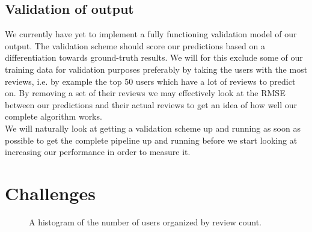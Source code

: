 \documentclass[10pt,twocolumn,letterpaper]{article}
\begin{document}
\subsection{Validation of output}
We currently have yet to implement a fully functioning validation model of our output. The validation scheme should score our predictions based on a differentiation towards ground-truth results. We will for this exclude some of our training data for validation purposes preferably by taking the users with the most reviews, i.e. by example the top 50 users which have a lot of reviews to predict on. By removing a set of their reviews we may effectively look at the RMSE between our predictions and their actual reviews to get an idea of how well our complete algorithm works.
\\[.5em]
\indent We will naturally look at getting a validation scheme up and running as soon as possible to get the complete pipeline up and running before we start looking at increasing our performance in order to measure it.

\section{Challenges}

\begin{figure}[t]
\begin{center}
\end{center}
   \caption{A histogram of the number of users organized by review count.}
\label{fig:usrCnt}
\end{figure}
\end{document}
